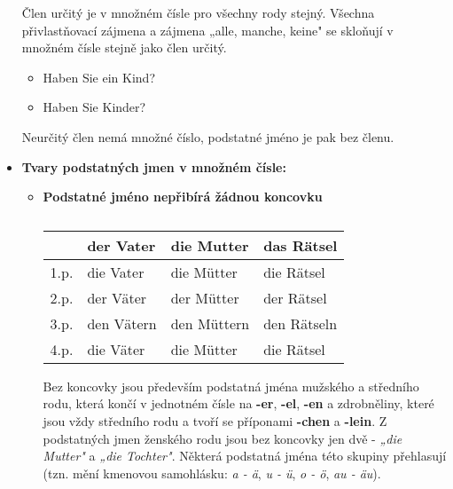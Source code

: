 \begin{itemize}
              Člen určitý je v množném čísle pro všechny rody stejný. Všechna přivlastňovací 
              zájmena a zájmena „alle, manche, keine" se skloňují v množném čísle stejně jako člen 
              určitý.
              \begin{itemize}
                \addtolength{\itemindent}{5em}
                \item Haben Sie ein Kind?
                \item Haben Sie Kinder?
              \end{itemize}
              Neurčitý člen nemá množné číslo, podstatné jméno je pak bez členu.
        \item \textbf{Tvary podstatných jmen v množném čísle:}
          \begin{itemize}
            \item \textbf{Podstatné jméno nepřibírá žádnou koncovku}\newline
              \begin{table}[ht!]   %
                \hspace*{4em}
                \begin{tabular}{l|lll}
                       & \textbf{der Vater}  & \textbf{die Mutter}  & \textbf{das Rätsel}  \\
                  \hline
                  1.p. & die Vater           & die Mütter           & die Rätsel           \\
                  2.p. & der Väter           & der Mütter           & der Rätsel           \\
                  3.p. & den Vätern          & den Müttern          & den Rätseln          \\
                  4.p. & die Väter           & die Mütter           & die Rätsel           \\
                  \hline
                \end{tabular}
                \caption*{ }
              \end{table}
        
              Bez koncovky jsou především podstatná jména mužského a středního rodu, která končí v 
              jednotném čísle na \textbf{-er}, \textbf{-el}, \textbf{-en} a zdrobněliny, které jsou 
              vždy středního rodu a tvoří se příponami \textbf{-chen} a \textbf{-lein}. Z 
              podstatných jmen ženského rodu jsou bez koncovky jen dvě - \emph{„die Mutter"} a 
              \emph{„die Tochter"}. Některá podstatná jména této skupiny přehlasují (tzn. mění 
              kmenovou samohlásku: \emph{a - ä}, \emph{u - ü}, \emph{o - ö}, \emph{au - äu}).
      

\end{itemize}
\end{itemize}
